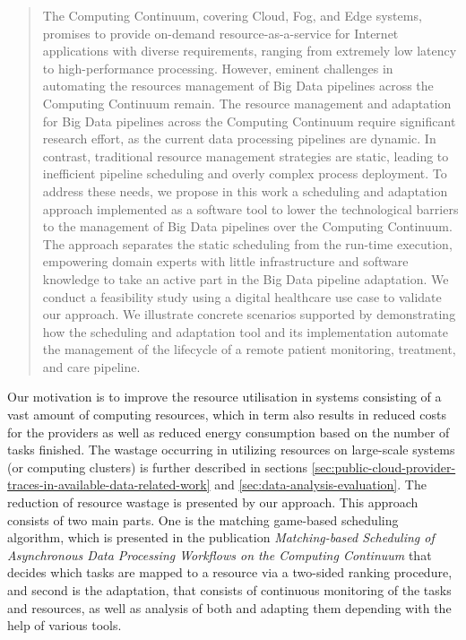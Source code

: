             \begin{quote}
                The Computing Continuum, covering Cloud, Fog, and Edge systems, promises to provide on-demand resource-as-a-service for Internet applications with diverse requirements, ranging from extremely low latency to high-performance processing. However, eminent challenges in automating the resources management of Big Data pipelines across the Computing Continuum remain. The resource management and adaptation for Big Data pipelines across the Computing Continuum require significant research effort, as the current data processing pipelines are dynamic. In contrast, traditional resource management strategies are static, leading to inefficient pipeline scheduling and overly complex process deployment. To address these needs, we propose in this work a scheduling and adaptation approach implemented as a software tool to lower the technological barriers to the management of Big Data pipelines over the Computing Continuum. The approach separates the static scheduling from the run-time execution, empowering domain experts with little infrastructure and software knowledge to take an active part in the Big Data pipeline adaptation. We conduct a feasibility study using a digital healthcare use case to validate our approach. We illustrate concrete scenarios supported by demonstrating how the scheduling and adaptation tool and its implementation automate the management of the lifecycle of a remote patient monitoring, treatment, and care pipeline. \cite{kimovskiBigDataPipeline2022}
            \end{quote}
            Our motivation is to improve the resource utilisation in systems consisting of a vast amount of computing resources, which in term also results in reduced costs for the providers as well as reduced energy consumption based on the number of tasks finished.
            The wastage occurring in utilizing resources on large-scale systems (or computing clusters) is further described in sections \ref{sec:public-cloud-provider-traces-in-available-data-related-work} and \ref{sec:data-analysis-evaluation}.
            The reduction of resource wastage is presented by our  approach. 
            This approach consists of two main parts. One is the matching game-based scheduling algorithm, which is presented in the publication \emph{Matching-based Scheduling of Asynchronous Data Processing Workflows on the Computing Continuum} \cite{mehranMatchingbasedSchedulingAsynchronous2022} that decides which tasks are mapped to a resource via a two-sided ranking procedure, and second is the adaptation, that consists of continuous monitoring of the tasks and resources, as well as analysis of both and adapting them depending with the help of various tools.


